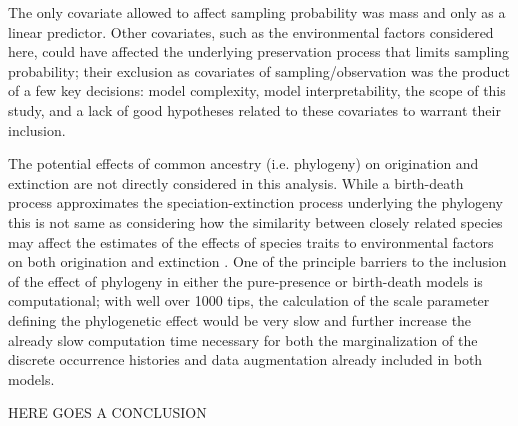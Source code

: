 \documentclass[12pt,letterpaper]{article}
\begin{document}
The only covariate allowed to affect sampling probability was mass and only as a linear predictor. Other covariates, such as the environmental factors considered here, could have affected the underlying preservation process that limits sampling probability; their exclusion as covariates of sampling/observation was the product of a few key decisions: model complexity, model interpretability, the scope of this study, and a lack of good hypotheses related to these covariates to warrant their inclusion. %


The potential effects of common ancestry (i.e. phylogeny) on origination and extinction are not directly considered in this analysis. While a birth-death process approximates the speciation-extinction process underlying the phylogeny \citep{Silvestro2014a} this is not same as considering how the similarity between closely related species may affect the estimates of the effects of species traits to environmental factors on both origination and extinction \citep{Smits2015b,Harnik2014}. One of the principle barriers to the inclusion of the effect of phylogeny in either the pure-presence or birth-death models is computational; with well over 1000 tips, the calculation of the scale parameter defining the phylogenetic effect would be very slow and further increase the already slow computation time necessary for both the marginalization of the discrete occurrence histories and data augmentation already included in both models.

\uppercase{here goes a conclusion}
\end{document}
